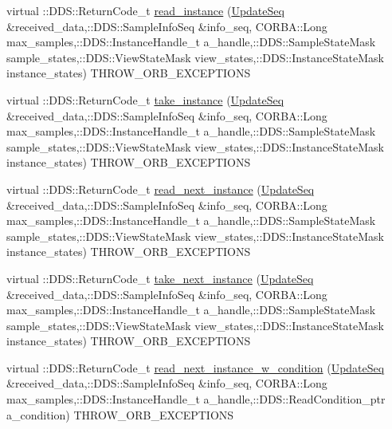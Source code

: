 \begin{DoxyCompactItemize}
\item 
virtual ::DDS::ReturnCode\_\-t \hyperlink{classKnowledge_1_1UpdateDataReader__impl_a13386930e872a16cf9f644271c631597}{read\_\-instance} (\hyperlink{namespaceKnowledge_ab62e46316b954f0d249e0e45de7059dc}{UpdateSeq} \&received\_\-data,::DDS::SampleInfoSeq \&info\_\-seq, CORBA::Long max\_\-samples,::DDS::InstanceHandle\_\-t a\_\-handle,::DDS::SampleStateMask sample\_\-states,::DDS::ViewStateMask view\_\-states,::DDS::InstanceStateMask instance\_\-states) THROW\_\-ORB\_\-EXCEPTIONS
\item 
virtual ::DDS::ReturnCode\_\-t \hyperlink{classKnowledge_1_1UpdateDataReader__impl_a2d49aceb88186f3befbd50947f249d1d}{take\_\-instance} (\hyperlink{namespaceKnowledge_ab62e46316b954f0d249e0e45de7059dc}{UpdateSeq} \&received\_\-data,::DDS::SampleInfoSeq \&info\_\-seq, CORBA::Long max\_\-samples,::DDS::InstanceHandle\_\-t a\_\-handle,::DDS::SampleStateMask sample\_\-states,::DDS::ViewStateMask view\_\-states,::DDS::InstanceStateMask instance\_\-states) THROW\_\-ORB\_\-EXCEPTIONS
\item 
virtual ::DDS::ReturnCode\_\-t \hyperlink{classKnowledge_1_1UpdateDataReader__impl_a9a4ba7faf8a62d8a05bd806d06e680a1}{read\_\-next\_\-instance} (\hyperlink{namespaceKnowledge_ab62e46316b954f0d249e0e45de7059dc}{UpdateSeq} \&received\_\-data,::DDS::SampleInfoSeq \&info\_\-seq, CORBA::Long max\_\-samples,::DDS::InstanceHandle\_\-t a\_\-handle,::DDS::SampleStateMask sample\_\-states,::DDS::ViewStateMask view\_\-states,::DDS::InstanceStateMask instance\_\-states) THROW\_\-ORB\_\-EXCEPTIONS
\item 
virtual ::DDS::ReturnCode\_\-t \hyperlink{classKnowledge_1_1UpdateDataReader__impl_a74a278a82135dee9a4588571e6b63a1b}{take\_\-next\_\-instance} (\hyperlink{namespaceKnowledge_ab62e46316b954f0d249e0e45de7059dc}{UpdateSeq} \&received\_\-data,::DDS::SampleInfoSeq \&info\_\-seq, CORBA::Long max\_\-samples,::DDS::InstanceHandle\_\-t a\_\-handle,::DDS::SampleStateMask sample\_\-states,::DDS::ViewStateMask view\_\-states,::DDS::InstanceStateMask instance\_\-states) THROW\_\-ORB\_\-EXCEPTIONS
\item 
virtual ::DDS::ReturnCode\_\-t \hyperlink{classKnowledge_1_1UpdateDataReader__impl_acf37dbe673ba2113b8533a0a3eda62e3}{read\_\-next\_\-instance\_\-w\_\-condition} (\hyperlink{namespaceKnowledge_ab62e46316b954f0d249e0e45de7059dc}{UpdateSeq} \&received\_\-data,::DDS::SampleInfoSeq \&info\_\-seq, CORBA::Long max\_\-samples,::DDS::InstanceHandle\_\-t a\_\-handle,::DDS::ReadCondition\_\-ptr a\_\-condition) THROW\_\-ORB\_\-EXCEPTIONS

\end{DoxyCompactItemize}
